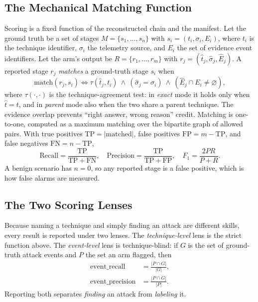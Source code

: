 \documentclass[journal]{IEEEtran}
\begin{document}
\subsection{The Mechanical Matching Function}
Scoring is a fixed function of the reconstructed chain and the manifest. Let the ground truth be a set
of stages $M=\{s_1,\dots,s_n\}$ with $s_i=(t_i,\sigma_i,E_i)$, where $t_i$ is the technique
identifier, $\sigma_i$ the telemetry source, and $E_i$ the set of evidence event identifiers. Let the
arm's output be $R=\{r_1,\dots,r_m\}$ with $r_j=(\hat t_j,\hat\sigma_j,\hat E_j)$. A reported stage
$r_j$ \emph{matches} a ground-truth stage $s_i$ when
\begin{equation}
\mathrm{match}(r_j,s_i)\iff \tau(\hat t_j,t_i)\ \wedge\ (\hat\sigma_j=\sigma_i)\ \wedge\ (\hat E_j\cap E_i\neq\varnothing),
\label{eq:match}
\end{equation}
where $\tau(\cdot,\cdot)$ is the technique-agreement test: in \emph{exact} mode it holds only when
$\hat t=t$, and in \emph{parent} mode also when the two share a parent technique. The evidence
overlap prevents ``right answer, wrong reason'' credit. Matching is one-to-one, computed as a maximum
matching over the bipartite graph of allowed pairs. With true positives
$\mathrm{TP}=|\mathrm{matched}|$, false positives $\mathrm{FP}=m-\mathrm{TP}$, and false negatives
$\mathrm{FN}=n-\mathrm{TP}$,
\begin{equation}
\mathrm{Recall}=\frac{\mathrm{TP}}{\mathrm{TP}+\mathrm{FN}},\quad
\mathrm{Precision}=\frac{\mathrm{TP}}{\mathrm{TP}+\mathrm{FP}},\quad
F_1=\frac{2PR}{P+R}.
\end{equation}
A benign scenario has $n=0$, so any reported stage is a false positive, which is how false alarms are
measured.

\subsection{The Two Scoring Lenses}
Because naming a technique and simply finding an attack are different skills, every result is reported
under two lenses. The \emph{technique-level} lens is the strict function above. The \emph{event-level}
lens is technique-blind: if $G$ is the set of ground-truth attack events and $P$ the set an arm
flagged, then
\begin{align}
\mathrm{event\_recall}&=\frac{|P\cap G|}{|G|},\\
\mathrm{event\_precision}&=\frac{|P\cap G|}{|P|}.
\end{align}
Reporting both separates \emph{finding} an attack from \emph{labeling} it.
\end{document}
